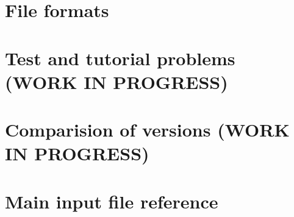 \documentclass[12pt,a4paper]{report}
\begin{document}










%
%


\chapter{File formats}





% 
%   


\chapter{Test and tutorial problems (WORK IN PROGRESS)}
 \label{chapter:tests}
 
% 
 \chapter{Comparision of versions (WORK IN PROGRESS)}
 \label{chapter:version_comparision}
 

\chapter{Main input file reference}
\label{chapter:input-tree-reference}






\end{document}
